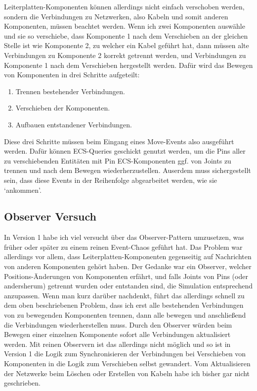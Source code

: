 \documentclass{article}
\begin{document}
    Leiterplatten-Komponenten können allerdings nicht einfach verschoben werden, sondern die Verbindungen zu Netzwerken,
    also Kabeln und somit anderen Komponenten, müssen beachtet werden.
    Wenn ich zwei Komponenten auswähle und sie so verschiebe,
    dass Komponente 1 nach dem Verschieben an der gleichen Stelle ist wie Komponente 2, zu welcher ein Kabel geführt hat,
    dann müssen alte Verbindungen zu Komponente 2 korrekt getrennt werden, und Verbindungen zu Komponente 1 nach dem Verschieben
    hergestellt werden.
    Dafür wird das Bewegen von Komponenten in drei Schritte aufgeteilt:
    \begin{enumerate}
        \item Trennen bestehender Verbindungen.
        \item Verschieben der Komponenten.
        \item Aufbauen entstandener Verbindungen.
    \end{enumerate}
    Diese drei Schritte müssen beim Eingang eines Move-Events also ausgeführt werden. Dafür können ECS-Queries geschickt
    genutzt werden, um die Pins aller zu verschiebenden Entitäten mit Pin ECS-Komponenten ggf. von Joints zu trennen und nach
    dem Bewegen wiederherzustellen.
    Auserdem muss sichergestellt sein, dass diese Events in der Reihenfolge abgearbeitet werden, wie sie `ankommen'.

    \subsection{Observer Versuch}
    In Version 1 habe ich viel versucht über das Observer-Pattern umzusetzen, was früher oder später zu einem reinen Event-Chaos
    geführt hat.
    Das Problem war allerdings vor allem, dass Leiterplatten-Komponenten gegenseitig auf Nachrichten von anderen Komponenten
    gehört haben.
    Der Gedanke war ein Observer, welcher Positions-Änderungen von Komponenten erfährt, und falls Joints von Pins (oder andersherum)
    getrennt wurden oder entstanden sind, die Simulation entsprechend anzupassen.
    Wenn man kurz darüber nachdenkt, führt das allerdings schnell zu dem oben beschriebenen Problem, dass ich erst alle bestehenden Verbindungen
    von zu bewegenden Komponenten trennen, dann alle bewegen und anschließend die Verbindungen wiederherstellen muss.
    Durch den Observer würden beim Bewegen einer einzelnen Komponente sofort alle Verbindungen aktualisiert werden.
    Mit reinen Observern ist das allerdings nicht möglich und so ist in Version 1 die Logik zum Synchronisieren der Verbindungen
    bei Verschieben von Komponenten in die Logik zum Verschieben selbst gewandert.
    Vom Aktualisieren der Netzwerke beim Löschen oder Erstellen von Kabeln habe ich bisher gar nicht geschrieben.
\end{document}
